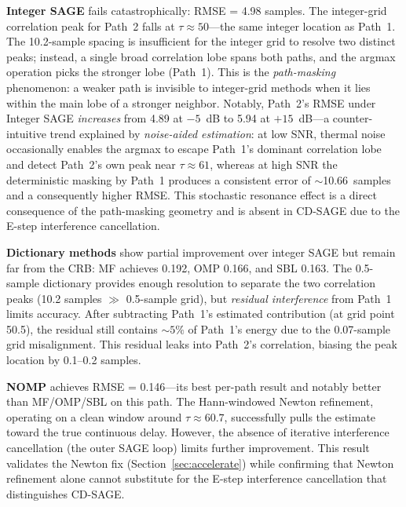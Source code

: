 \documentclass[journal]{IEEEtran}
\begin{document}
\textbf{Integer SAGE} fails catastrophically: RMSE = 4.98 samples. The integer-grid correlation peak for Path~2 falls at $\tau \approx 50$---the same integer location as Path~1. The 10.2-sample spacing is insufficient for the integer grid to resolve two distinct peaks; instead, a single broad correlation lobe spans both paths, and the argmax operation picks the stronger lobe (Path~1). This is the \textit{path-masking} phenomenon: a weaker path is invisible to integer-grid methods when it lies within the main lobe of a stronger neighbor. Notably, Path~2's RMSE under Integer SAGE \textit{increases} from 4.89 at $-5$~dB to 5.94 at $+15$~dB---a counter-intuitive trend explained by \textit{noise-aided estimation}: at low SNR, thermal noise occasionally enables the argmax to escape Path~1's dominant correlation lobe and detect Path~2's own peak near $\tau\approx61$, whereas at high SNR the deterministic masking by Path~1 produces a consistent error of $\sim$10.66~samples and a consequently higher RMSE. This stochastic resonance effect is a direct consequence of the path-masking geometry and is absent in CD-SAGE due to the E-step interference cancellation.

\textbf{Dictionary methods} show partial improvement over integer SAGE but remain far from the CRB: MF achieves 0.192, OMP 0.166, and SBL 0.163. The 0.5-sample dictionary provides enough resolution to separate the two correlation peaks (10.2 samples $\gg$ 0.5-sample grid), but \textit{residual interference} from Path~1 limits accuracy. After subtracting Path~1's estimated contribution (at grid point 50.5), the residual still contains $\sim 5\%$ of Path~1's energy due to the 0.07-sample grid misalignment. This residual leaks into Path~2's correlation, biasing the peak location by 0.1--0.2 samples.

\textbf{NOMP} achieves RMSE = 0.146---its best per-path result and notably better than MF/OMP/SBL on this path. The Hann-windowed Newton refinement, operating on a clean window around $\tau \approx 60.7$, successfully pulls the estimate toward the true continuous delay. However, the absence of iterative interference cancellation (the outer SAGE loop) limits further improvement. This result validates the Newton fix (Section~\ref{sec:accelerate}) while confirming that Newton refinement alone cannot substitute for the E-step interference cancellation that distinguishes CD-SAGE.
\end{document}
